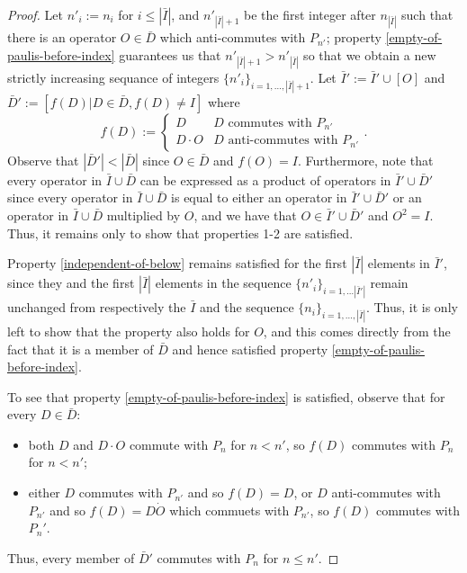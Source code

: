 \documentclass[twocolumn,showpacs,preprintnumbers,amsmath,amssymb,nofootinbib,pra,floatfix]{revtex4}
\begin{document}
\begin{proof}
Let $n'_i:=n_i$ for $i\le|\bar I|$, and $n'_{|\bar I|+1}$ be the first integer after $n_{|\bar I|}$ such that there is an operator $O\in\bar D$ which anti-commutes with $P_{n'}$;  property \ref{empty-of-paulis-before-index} guarantees us that $n'_{|\bar I|+1}>n'_{|\bar I|}$ so that we obtain a new strictly increasing sequance of integers $\{n'_i\}_{i=1,\dots,|\bar I|+1}$.  Let $\bar I':=\bar I'\cup [O]$ and $\bar D':=[f(D)|D\in \bar D, f(D)\ne I]$ where 
$$f(D):=
\begin{cases}
D & \text{$D$ commutes with $P_{n'}$} \\
D\cdot O & \text{$D$ anti-commutes with $P_{n'}$}
\end{cases}.$$  Observe that $|\bar D'|<|\bar D|$ since $O\in \bar D$ and $f(O)=I$.  Furthermore, note that every operator in $\bar I\cup \bar D$ can be expressed as a product of operators in $\bar I'\cup \bar D'$ since every operator in $\bar I\cup \bar D$ is equal to either an operator in $\bar I'\cup\bar D'$ or an operator in $\bar I\cup\bar D$ multiplied by $O$, and we have that $O\in \bar I'\cup \bar D'$ and $O^2=I$.  Thus, it remains only to show that properties 1-2 are satisfied.

Property \ref{independent-of-below} remains satisfied for the first $|\bar I|$ elements in $\bar I'$, since they and the first $|\bar I|$  elements in the sequence $\{n'_i\}_{i=1,\dots |\bar I'|}$ remain unchanged from respectively the $\bar I$ and the sequence $\{n_i\}_{i= 1,\dots,|\bar I|}$.  Thus, it is only left to show that the property also holds for $O$, and this comes directly from the fact that it is a member of $\bar D$ and hence satisfied property \ref{empty-of-paulis-before-index}.

To see that property \ref{empty-of-paulis-before-index} is satisfied, observe that for every $D\in \bar D$:
\begin{itemize}
\item both $D$ and $D\cdot O$ commute with $P_n$ for $n<n'$, so $f(D)$ commutes with $P_n$ for $n<n'$;
\item either $D$ commutes with $P_{n'}$ and so $f(D)=D$, or $D$ anti-commutes with $P_{n'}$ and so $f(D)=D\dot O$ which commuets with $P_{n'}$, so $f(D)$ commutes with $P_n'$.
\end{itemize} Thus, every member of $\bar D'$ commutes with $P_n$ for $n\le n'$.
\end{proof}
\end{document}
